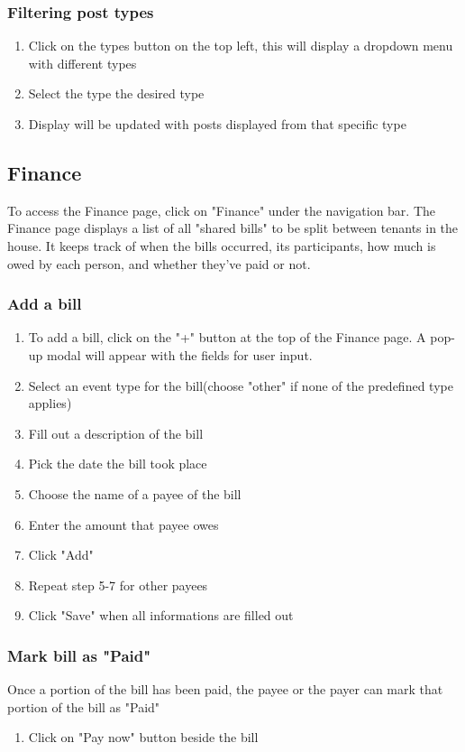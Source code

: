 \documentclass[12pt]{article}
\begin{document}
    \subsubsection{Filtering post types}
    \begin{enumerate}
        \item Click on the types button on the top left, this will display a dropdown menu with different types
        \item Select the type the desired type
        \item Display will be updated with posts displayed from that specific type
    \end{enumerate}


    \subsection{Finance}
    To access the Finance page, click on "Finance" under the navigation bar. The Finance page displays a list of all "shared bills" to be split between tenants in the house. It keeps track of when the bills occurred, its participants, how much is owed by each person, and whether they've paid or not.

    \subsubsection{Add a bill}
    \begin{enumerate}
        \item To add a bill, click on the "+" button at the top of the Finance page. A pop-up modal will appear with the fields for user input.
        \item Select an event type for the bill(choose "other" if none of the predefined type applies)
        \item Fill out a description of the bill
        \item Pick the date the bill took place
        \item Choose the name of a payee of the bill
        \item Enter the amount that payee owes
        \item Click "Add"
        \item Repeat step 5-7 for other payees
        \item Click "Save" when all informations are filled out
    \end{enumerate}

    \subsubsection{Mark bill as "Paid"}
    Once a portion of the bill has been paid, the payee or the payer can mark that portion of the bill as "Paid"
    \begin{enumerate}
        \item Click on "Pay now" button beside the bill
    \end{enumerate}
\end{document}
